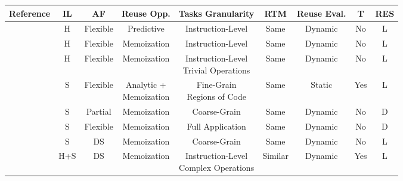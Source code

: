 \begin{adjustbox}{angle=0}
\begin{scriptsize}
\begin{tabular}{ccccccccc}
\toprule

Reference       & IL         & AF & Reuse Opp. & Tasks Granularity                                & RTM & Reuse Eval. & T & RES \\

\midrule

\cite{reuse1} & H            & Flexible                   & Predictive          & Instruction-Level                                & Same       & Dynamic          & No             & L   \\
\cite{reuse2} & H            & Flexible                   & Memoization         & Instruction-Level                                & Same       & Dynamic          & No             & L   \\
\cite{reuse3} & H            & Flexible                   & Memoization         & \makecell{Instruction-Level \\ Trivial Operations}             & Same       & Dynamic          & No             & L   \\
\cite{reuse4} & S            & Flexible                   & \makecell{Analytic + \\ Memoization}  & \makecell{Fine-Grain \\ Regions of Code} & Same       & Static           & Yes            & L   \\
\cite{reuse5} & S            & Partial                 & Memoization         & Coarse-Grain                          & Same       & Dynamic          & No             & D   \\
\cite{reuse7} & S            & Flexible                   & Memoization         & Full Application                                  & Same       & Dynamic          & No           & D  \\
\cite{reuse8} & S            & DS                    & Memoization         & Coarse-Grain          & Same       & Dynamic          & No             & L   \\
\cite{reuse9}       & H+S & DS                    & Memoization         & \makecell{Instruction-Level \\ Complex Operations} & Similar             & Dynamic          & Yes            & L   \\

\end{tabular}
\end{scriptsize}
\end{adjustbox}
